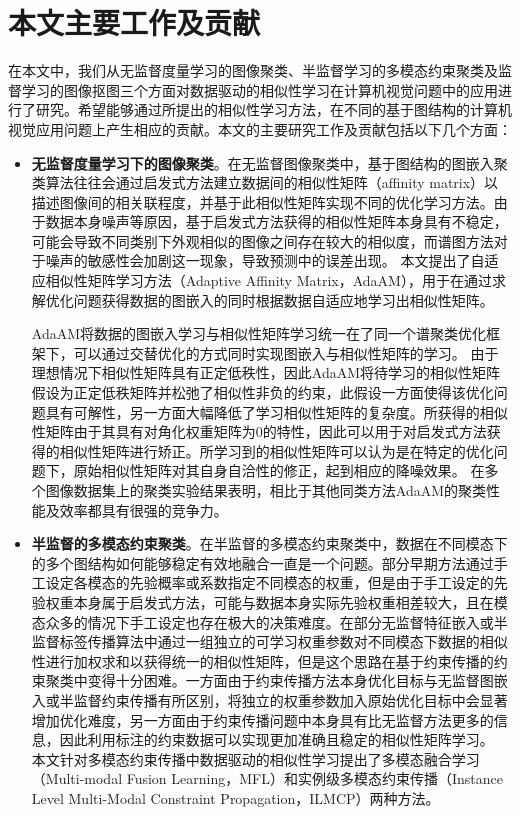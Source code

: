 \section{本文主要工作及贡献}
在本文中，我们从无监督度量学习的图像聚类、半监督学习的多模态约束聚类及监督学习的图像抠图三个方面对数据驱动的相似性学习在计算机视觉问题中的应用进行了研究。希望能够通过所提出的相似性学习方法，在不同的基于图结构的计算机视觉应用问题上产生相应的贡献。本文的主要研究工作及贡献包括以下几个方面：
\begin{itemize}
    \item {\bf{无监督度量学习下的图像聚类}}。在无监督图像聚类中，基于图结构的图嵌入聚类算法往往会通过启发式方法建立数据间的相似性矩阵（affinity matrix）以描述图像间的相关联程度，并基于此相似性矩阵实现不同的优化学习方法。由于数据本身噪声等原因，基于启发式方法获得的相似性矩阵本身具有不稳定，可能会导致不同类别下外观相似的图像之间存在较大的相似度，而谱图方法对于噪声的敏感性会加剧这一现象，导致预测中的误差出现。        
    本文提出了自适应相似性矩阵学习方法（Adaptive Affinity Matrix，AdaAM），用于在通过求解优化问题获得数据的图嵌入的同时根据数据自适应地学习出相似性矩阵。

    \indent AdaAM将数据的图嵌入学习与相似性矩阵学习统一在了同一个谱聚类优化框架下，可以通过交替优化的方式同时实现图嵌入与相似性矩阵的学习。
    由于理想情况下相似性矩阵具有正定低秩性，因此AdaAM将待学习的相似性矩阵假设为正定低秩矩阵并松弛了相似性非负的约束，此假设一方面使得该优化问题具有可解性，另一方面大幅降低了学习相似性矩阵的复杂度。所获得的相似性矩阵由于其具有对角化权重矩阵为$0$的特性，因此可以用于对启发式方法获得的相似性矩阵进行矫正。所学习到的相似性矩阵可以认为是在特定的优化问题下，原始相似性矩阵对其自身自洽性的修正，起到相应的降噪效果。
    在多个图像数据集上的聚类实验结果表明，相比于其他同类方法AdaAM的聚类性能及效率都具有很强的竞争力。


    \item {\bf{半监督的多模态约束聚类}}。在半监督的多模态约束聚类中，数据在不同模态下的多个图结构如何能够稳定有效地融合一直是一个问题。部分早期方法通过手工设定各模态的先验概率或系数指定不同模态的权重，但是由于手工设定的先验权重本身属于启发式方法，可能与数据本身实际先验权重相差较大，且在模态众多的情况下手工设定也存在极大的决策难度。在部分无监督特征嵌入或半监督标签传播算法中通过一组独立的可学习权重参数对不同模态下数据的相似性进行加权求和以获得统一的相似性矩阵\cite{wang2009unified,xu2016discriminatively,xu2014multi}，但是这个思路在基于约束传播的约束聚类中变得十分困难。一方面由于约束传播方法本身优化目标与无监督图嵌入或半监督约束传播有所区别，将独立的权重参数加入原始优化目标中会显著增加优化难度，另一方面由于约束传播问题中本身具有比无监督方法更多的信息，因此利用标注的约束数据可以实现更加准确且稳定的相似性矩阵学习。    
    本文针对多模态约束传播中数据驱动的相似性学习提出了多模态融合学习（Multi-modal Fusion Learning，MFL）和实例级多模态约束传播（Instance Level Multi-Modal Constraint Propagation，ILMCP）两种方法。


\end{itemize}
